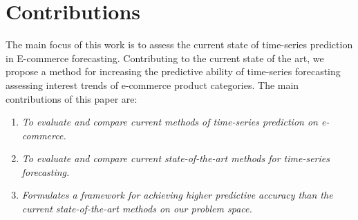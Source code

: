 \section{Contributions}
\label{sections:Introduction:Contributions}

The main focus of this work is to assess the current state of time-series prediction in E-commerce forecasting.
Contributing to the current state of the art,
we propose a method for increasing the predictive ability of time-series forecasting
assessing interest trends of e-commerce product categories.
The main contributions of this paper are:

\begin{enumerate}
  \item {\it To evaluate and compare current methods of time-series prediction on e-commerce.}
  \item {\it To evaluate and compare current state-of-the-art methods for time-series forecasting.}
  \item {\it Formulates a framework for achieving higher predictive accuracy than the current state-of-the-art methods on our problem space.}
\end{enumerate}


\iffalse
  The main description of the contributions will come in \Cref{cont} after the results are presented. This section just provides a brief summary of the main contributions of the work. This section can also be left out, leaving all discussions in \Cref{cont}.

  The format of this section will generally follow the following format:
  {\it
  Donec non turpis nec neque egestas faucibus nec id neque. Etiam consectetur, odio vitae gravida tempus, diam velit sagittis turpis, a molestie ligula tellus at nunc. Nam convallis consequat vestibulum. Proin dolor neque, dapibus a pellentesque a, commodo a nibh.}

  \begin{enumerate}
    \item {\it Lorem ipsum dolor sit amet, consectetur adipiscing elit.}
    \item {\it Lorem ipsum dolor sit amet, consectetur adipiscing elit.}
    \item {\it Lorem ipsum dolor sit amet, consectetur adipiscing elit.}
  \end{enumerate}
\fi
